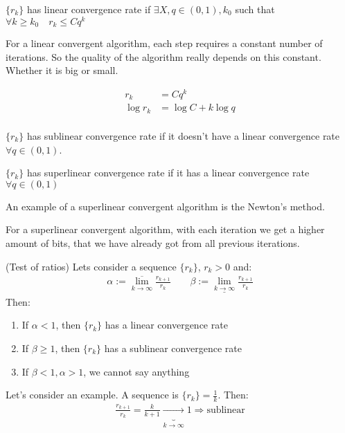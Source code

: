\begin{definition}
  $\{r_k\}$ has linear convergence rate if $\exists X, q \in (0, 1), k_0$ such that $\forall k \geqslant k_0 \quad r_{k} \leqslant C q^k$
\end{definition}

For a linear convergent algorithm, each step requires a constant number of iterations.
So the quality of the algorithm really depends on this constant. Whether it is big or small.

\begin{align*}
  r_k &= C q^k \\ 
  \log r_k &= \log C + k \log q \\
\end{align*}

\begin{definition}
  $\{r_k\}$ has sublinear convergence rate if it doesn't have a linear convergence rate $\forall q \in (0, 1)$. 
\end{definition}

\begin{definition}
  $\{r_k\}$ has superlinear convergence rate if it has a linear convergence rate $\forall q \in (0, 1)$ 
\end{definition}

\notice \; An example of a superlinear convergent algorithm is the Newton's method.

\notice \; For a superlinear convergent algorithm, with each iteration we get a higher amount of bits, that we have already got from all previous iterations. 

\begin{theorem} (Test of ratios) Lets consider a sequence $\{r_k\}$, $r_k > 0$ and: 
\begin{gather*}
  \alpha := \overline{\lim_{k \to \infty}} \frac{r_{k+1}}{r_k} \qquad \beta := \underline{\lim_{k \to \infty}} \frac{r_{k+1}}{r_k} 
\end{gather*}
Then: 
\begin{enumerate}
  \item If $\alpha < 1$, then $\{r_k\}$ has a linear convergence rate
  \item If $\beta \geqslant 1$, then $\{r_k\}$ has a sublinear convergence rate
  \item If $\beta < 1, \alpha > 1$, we cannot say anything
\end{enumerate}
\end{theorem}

Let's consider an example. A sequence is $\{r_k\} = \frac{1}{k}$. Then: 
\begin{gather*}
  \frac{r_{k+1}}{r_k} = \frac{k}{k+1} \underbrace{\longrightarrow}_{k \to \infty} 1 \Longrightarrow \text{sublinear} 
\end{gather*}

